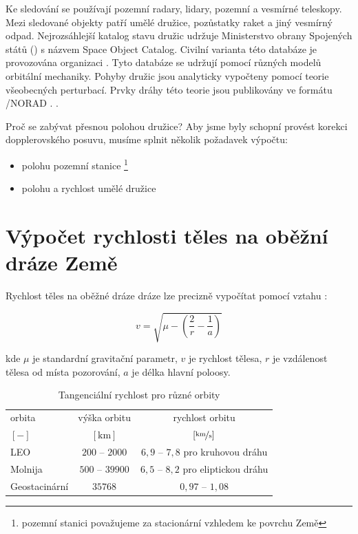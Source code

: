 Ke sledování se používají pozemní radary, lidary, pozemní  a vesmírné teleskopy. Mezi sledované objekty patří umělé družice, pozůstatky raket a jiný vesmírný odpad. Nejrozsáhlejší katalog stavu družic udržuje Ministerstvo obrany Spojených států () s názvem Space Object Catalog. Civilní varianta této databáze je provozována organizaci . Tyto databáze se udržují pomocí různých modelů orbitální mechaniky. Pohyby družic jsou analyticky vypočteny pomocí teorie všeobecných perturbací. Prvky dráhy této teorie jsou publikovány ve formátu /NORAD . \cite{wiki:US_space_surv}.

Proč se zabývat přesnou polohou družice? Aby jsme byly schopní provést korekci dopplerovského posuvu, musíme splnit několik požadavek výpočtu:
\begin{itemize}
  \item polohu pozemní stanice \footnote{pozemní stanici považujeme za stacionární vzhledem ke povrchu Země}
  \item polohu a rychlost umělé družice
\end{itemize}


\section{Výpočet rychlosti těles na oběžní dráze Země}
\label{sec:doppler}
  Rychlost těles na oběžné dráze dráze lze precizně vypočítat pomocí vztahu \cite{wiki:orb_speed}:

  \begin{equation}
    v = \sqrt{\mu - \left( \frac{2}{r} - \frac{1}{a} \right)}
  \end{equation}

  kde $\mu$ je standardní gravitační parametr, $v$ je rychlost tělesa, $r$ je vzdálenost tělesa od místa pozorování, $a$ je délka hlavní poloosy.

  \begin{table}[ht]
    \begin{tabular}{l | c c }
      orbita        & výška orbitu     & rychlost orbitu                        \\
      $[-]$         & $[\mathrm{km}]$  & $[\nicefrac{\mathrm{km}}{\mathrm{s}}]$ \\
      \hline
      LEO           & $200$ -- $2000$  & $6{,}9$ -- $7{,}8$ pro kruhovou dráhu  \\
      Molnija       & $500$ -- $39900$ & $6{,}5$ -- $8{,}2$ pro eliptickou dráhu\\
      Geostacinární & $35768$          & $0{,}97$ -- $1{,}08$
    \end{tabular}
    \caption{Tangenciální rychlost pro různé orbity \cite{wiki:orb_speed}}
    \label{tab:orbit_vel}
  \end{table}

